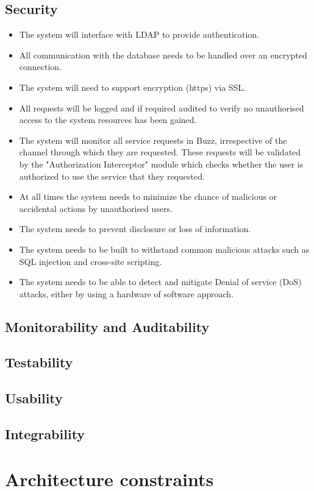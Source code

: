 \documentclass[a4paper,12pt]{article}
\begin{document}
\subsection{Security}
\begin{itemize}
	\item The system will interface with LDAP to provide authentication.
	\item All communication with the database needs to be handled over an encrypted connection.
	\item The system will need to support encryption (https) via SSL.
	\item All requests will be logged and if required audited to verify no unauthorised access to the system resources has been gained.
	\item The system will monitor all service requests in Buzz, irrespective of the channel through which they are requested. These requests will be validated by the "Authorization Interceptor" module which checks whether the user is authorized to use the service that they requested. 
	\item At all times the system needs to minimize the chance of malicious or accidental actions by unauthorised users. 
	\item The system needs to prevent disclosure or loss of information. 
	\item The system needs to be built to withstand common malicious attacks such as SQL injection and cross-site scripting.
	\item The system needs to be able to detect and mitigate Denial of service (DoS) attacks, either by using a hardware of software approach. 
\end{itemize}
\subsection{Monitorability and Auditability}
\subsection{Testability}
\subsection{Usability}
\subsection{Integrability}

\section{Architecture constraints}
\end{document}
